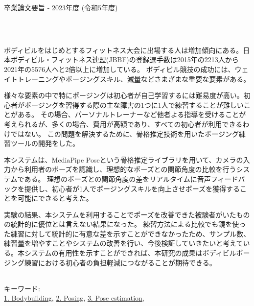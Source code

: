 卒業論文要旨 - 2023年度 (令和5年度)
\begin{center}
\begin{large}
\end{large}　
\end{center}

~ \\
  ボディビルをはじめとするフィットネス大会に出場する人は増加傾向にある。日本ボディビル・フィットネス連盟(JBBF)の登録選手数は2015年の2213人から2021年の5576人へと2倍以上に増加している\cite{jbbf}。
  ボディビル競技の成功には、ウェイトトレーニングやポージングスキル、減量などさまざまな重要な要素がある。

  様々な要素の中で特にポージングは初心者が自己学習するには難易度が高い。初心者がポージングを習得する際の主な障害の1つに1人で練習することが難しいことがある。
  その場合、パーソナルトレーナーなど他者よる指導を受けることが考えられるが、多くの場合、費用が高額であり、すべての初心者が利用できるわけではない。
  この問題を解決するために、骨格推定技術を用いたポージング練習ツールの開発をした。

  本システムは、MediaPipe Poseという骨格推定ライブラリを用いて、カメラの入力から利用者のポーズを認識し、理想的なポーズとの関節角度の比較を行うシステムである。
  理想のポーズとの関節角度の差をリアルタイムに音声フィードバックを提供し、初心者が1人でポージングスキルを向上させポーズを獲得することを可能にできると考えた。

  実験の結果、本システムを利用することでポーズを改善できた被験者がいたものの統計的に優位とは言えない結果になった。
  練習方法による比較でも鏡を使った練習に対して統計的に有意な差を示すことができなかったため、サンプル数、練習量を増やすことやシステムの改善を行い、今後検証していきたいと考えている。本システムの有用性を示すことができれば、本研究の成果はボディビルポージング練習における初心者の負担軽減につながることが期待できる。

~ \\
キーワード:\\
\underline{1. Bodybuilding},
\underline{2. Posing},
\underline{3. Pose estimation},
\begin{flushright}
\dept \\
\author
\end{flushright}

